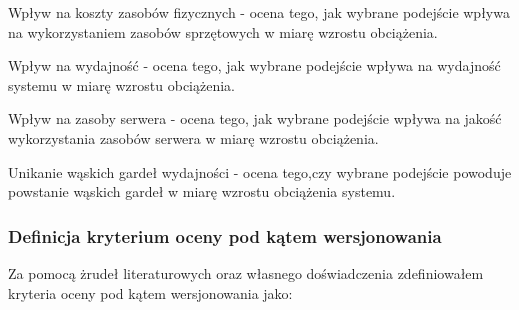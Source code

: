 \documentclass[runningheads,12pt]{llncs}
\begin{document}
Wpływ na koszty zasobów fizycznych - ocena tego, jak wybrane podejście wpływa na  wykorzystaniem zasobów sprzętowych w miarę wzrostu obciążenia.

Wpływ na wydajność - ocena tego, jak wybrane podejście wpływa na wydajność systemu w miarę wzrostu obciążenia.

Wpływ na zasoby serwera - ocena tego, jak wybrane podejście wpływa na jakość wykorzystania zasobów serwera w miarę wzrostu obciążenia.

Unikanie wąskich gardeł wydajności - ocena tego,czy wybrane podejście powoduje powstanie wąskich gardeł  w miarę wzrostu obciążenia systemu.

\subsubsection{Definicja kryterium oceny pod kątem wersjonowania}

Za pomocą żrudeł literaturowych oraz własnego doświadczenia zdefiniowałem kryteria oceny pod kątem wersjonowania jako: 
\end{document}
